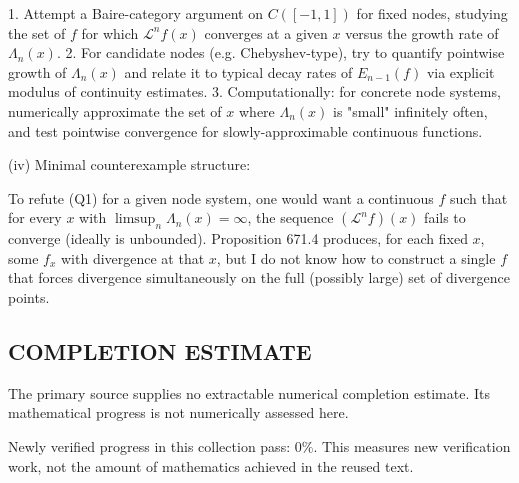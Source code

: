1. Attempt a Baire-category argument on $C([-1,1])$ for fixed nodes, studying the set of $f$ for which $\mathcal L^n f(x)$ converges at a given $x$ versus the growth rate of $\Lambda_n(x)$.
2. For candidate nodes (e.g. Chebyshev-type), try to quantify pointwise growth of $\Lambda_n(x)$ and relate it to typical decay rates of $E_{n-1}(f)$ via explicit modulus of continuity estimates.
3. Computationally: for concrete node systems, numerically approximate the set of $x$ where $\Lambda_n(x)$ is "small" infinitely often, and test pointwise convergence for slowly-approximable continuous functions.

(iv) Minimal counterexample structure:

To refute (Q1) for a given node system, one would want a continuous $f$ such that for every $x$ with $\limsup_n\Lambda_n(x)=\infty$, the sequence $(\mathcal L^n f)(x)$ fails to converge (ideally is unbounded). Proposition 671.4 produces, for each fixed $x$, some $f_x$ with divergence at that $x$, but I do not know how to construct a single $f$ that forces divergence simultaneously on the full (possibly large) set of divergence points.




\subsection*{COMPLETION ESTIMATE}
The primary source supplies no extractable numerical completion estimate. Its mathematical progress is not numerically assessed here.

Newly verified progress in this collection pass: $0\%$. This measures new verification work, not the amount of mathematics achieved in the reused text.

